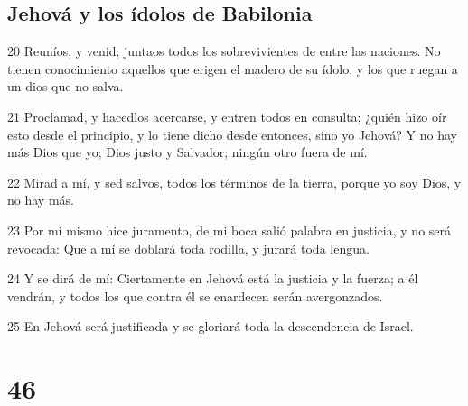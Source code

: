 \section*{Jehová y los ídolos de Babilonia}

\par 20 Reuníos, y venid; juntaos todos los sobrevivientes de entre las naciones. No tienen conocimiento aquellos que erigen el madero de su ídolo, y los que ruegan a un dios que no salva.
\par 21 Proclamad, y hacedlos acercarse, y entren todos en consulta; ¿quién hizo oír esto desde el principio, y lo tiene dicho desde entonces, sino yo Jehová? Y no hay más Dios que yo; Dios justo y Salvador; ningún otro fuera de mí.
\par 22 Mirad a mí, y sed salvos, todos los términos de la tierra, porque yo soy Dios, y no hay más.
\par 23 Por mí mismo hice juramento, de mi boca salió palabra en justicia, y no será revocada: Que a mí se doblará toda rodilla, y jurará toda lengua. 
\par 24 Y se dirá de mí: Ciertamente en Jehová está la justicia y la fuerza; a él vendrán, y todos los que contra él se enardecen serán avergonzados.
\par 25 En Jehová será justificada y se gloriará toda la descendencia de Israel.

\chapter{46}

